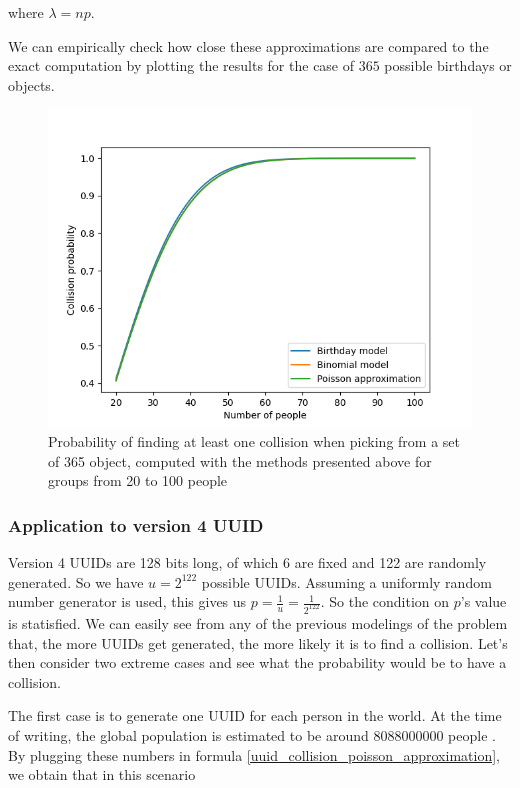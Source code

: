 \documentclass{report}
\begin{document}
where $\lambda=np$.

We can empirically check how close these approximations are compared to the exact computation by plotting the results for the case of $365$ possible birthdays or objects.

\begin{figure}[H]
		\includegraphics[scale=0.5]{Exact probability vs approximations}
		\caption{Probability of finding at least one collision when picking from a set of 365 object, computed with the methods presented above for groups from 20 to 100 people}
\end{figure}

\subsubsection{Application to version 4 UUID}
Version 4 UUIDs are 128 bits long, of which 6 are fixed and 122 are randomly generated. So we have $u=2^{122}$ possible UUIDs. Assuming a uniformly random number generator is used, this gives us
$p=\frac{1}{u}=\frac{1}{2^{122}}$. So the condition on $p$'s value is statisfied. We can easily see from any of the previous modelings of the problem that, the more UUIDs get generated, the more likely it is to find a
collision. Let's then consider two extreme cases and see what the probability would be to have a collision. \par
The first case is to generate one UUID for each person in the world. At the time of writing, the global population is estimated to be around \num{8088000000} people
\cite{world-population}. By plugging these numbers in formula \ref{uuid_collision_poisson_approximation}, we obtain that in this scenario
\end{document}
